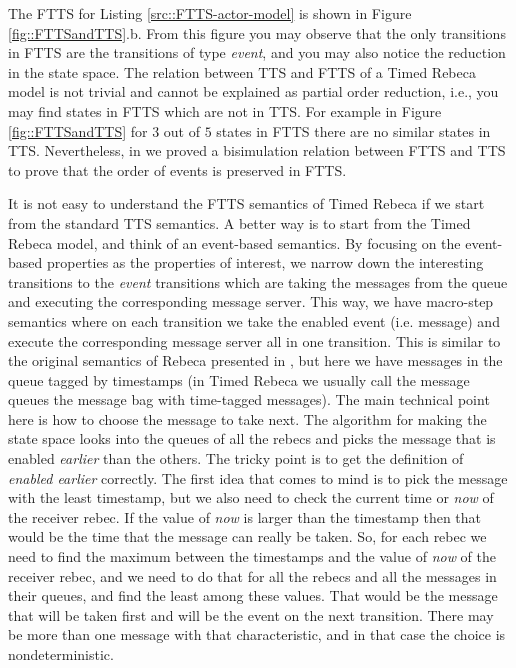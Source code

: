 The FTTS for Listing \ref{src::FTTS-actor-model} is shown in Figure \ref{fig::FTTSandTTS}.b. From this figure you may observe that the only transitions in FTTS are the transitions of type \textit{event}, and you may also notice the reduction in the state space.
%
The relation between TTS and FTTS of a Timed Rebeca model is not trivial and cannot be explained as partial order reduction, i.e., you may find states in FTTS which are not in TTS.
For example in Figure \ref{fig::FTTSandTTS} for $3$ out of $5$ states in FTTS there are no similar states in TTS. Nevertheless, in \cite{DBLP:conf/facs2/KhamespanahSVK15} we proved a bisimulation relation between FTTS and TTS to prove that the order of events is preserved in FTTS.

 It is not easy to understand the FTTS semantics of Timed Rebeca if we start from the standard TTS semantics. A better way is to start from the Timed Rebeca model, and think of an event-based semantics. By focusing on the event-based properties as the properties of interest, we narrow down the interesting transitions to the \textit{event} transitions which are taking the messages from the queue and executing the corresponding message server.
This way, we have macro-step semantics where on each transition we take the enabled event (i.e. message) and execute the corresponding message server all in one transition. This is similar to the original semantics of Rebeca presented in \cite{DBLP:journals/fuin/SirjaniMSB04}, but here we have messages in the queue tagged by timestamps (in Timed Rebeca we usually call the message queues the message bag with time-tagged messages). The main technical point here is how to choose the message to take next. The algorithm for making the state space looks into the queues of all the rebecs and picks the message that is enabled \textit{earlier} than the others.  The tricky point is to get the definition of \textit{enabled earlier} correctly. The first idea that comes to mind is to pick the message with the least timestamp, but we also need to check the current time or \textit{now} of the receiver rebec. If the value of \textit{now} is larger than the timestamp then that would be the time that the message can really be taken. So,  for each rebec we need to find the maximum between  the timestamps and the value of  \textit{now} of the receiver rebec, and we need to do that for all the rebecs and all the messages in their queues,  and find the least among these values. That would be the message that will be taken first and will be the event on the next transition. There may be more than one message with that characteristic, and in that case the choice is nondeterministic.

